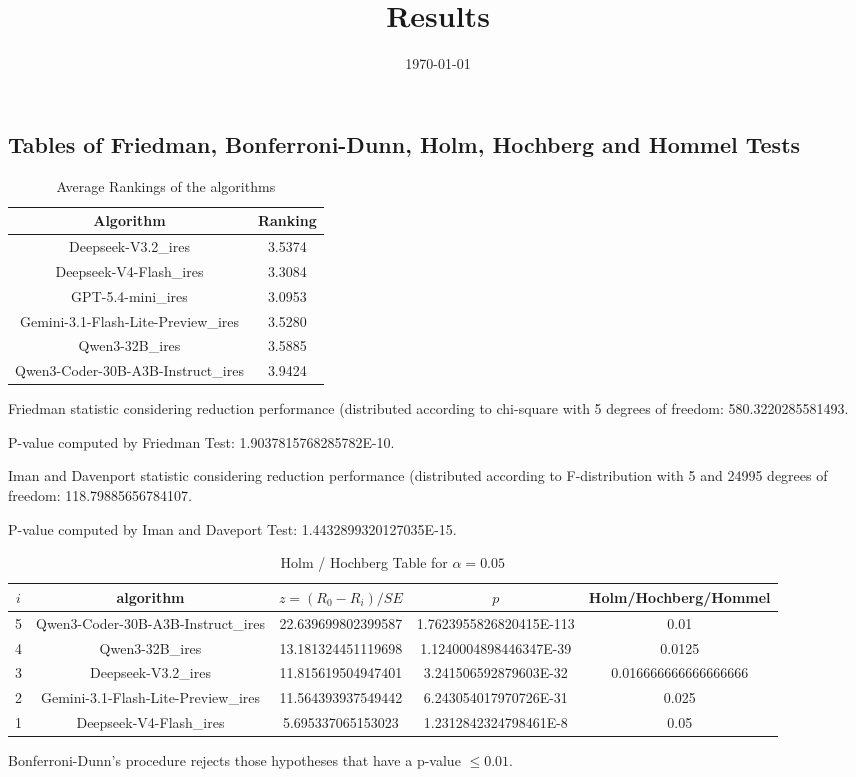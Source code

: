 \documentclass[a4paper,10pt]{article}
\title{Results}
\date{\today}
\begin{document}
\begin{landscape}
\oddsidemargin 0in \topmargin 0in\maketitle
\section{Tables of Friedman, Bonferroni-Dunn, Holm, Hochberg and Hommel Tests}
\begin{table}[!htp]
\centering
\caption{Average Rankings of the algorithms
}\begin{tabular}{c|c}
Algorithm&Ranking\\
\hline
Deepseek-V3.2_ires&3.5374\\
Deepseek-V4-Flash_ires&3.3084\\
GPT-5.4-mini_ires&3.0953\\
Gemini-3.1-Flash-Lite-Preview_ires&3.5280\\
Qwen3-32B_ires&3.5885\\
Qwen3-Coder-30B-A3B-Instruct_ires&3.9424\\
\end{tabular}
\end{table}


Friedman statistic considering reduction performance (distributed according to chi-square with 5 degrees of freedom: 580.3220285581493.


P-value computed by Friedman Test: 1.9037815768285782E-10.\newline

Iman and Davenport statistic considering reduction performance (distributed according to F-distribution with 5 and 24995 degrees of freedom: 118.79885656784107.


P-value computed by Iman and Daveport Test: 1.4432899320127035E-15.\newline

\begin{table}[!htp]
\centering\tiny
\caption{Holm / Hochberg Table for $\alpha=0.05$}
\begin{tabular}{ccccc}
$i$&algorithm&$z=(R_0 - R_i)/SE$&$p$&Holm/Hochberg/Hommel\\
\hline
5&Qwen3-Coder-30B-A3B-Instruct_ires&22.639699802399587&1.7623955826820415E-113&0.01\\
4&Qwen3-32B_ires&13.181324451119698&1.1240004898446347E-39&0.0125\\
3&Deepseek-V3.2_ires&11.815619504947401&3.241506592879603E-32&0.016666666666666666\\
2&Gemini-3.1-Flash-Lite-Preview_ires&11.564393937549442&6.243054017970726E-31&0.025\\
1&Deepseek-V4-Flash_ires&5.695337065153023&1.2312842324798461E-8&0.05\\
\hline
\end{tabular}
\end{table}
Bonferroni-Dunn's procedure rejects those hypotheses that have a p-value $\le0.01$.



\end{landscape}
\end{document}
